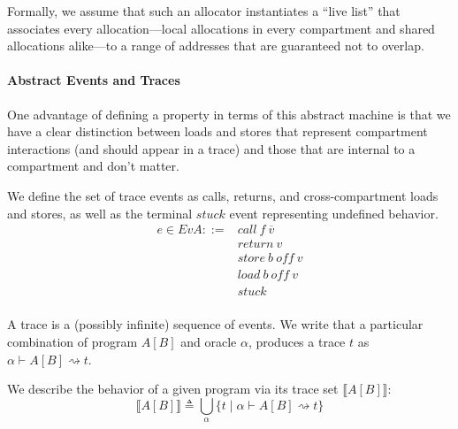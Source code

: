\documentclass{article}
\begin{document}
Formally, we assume that such an allocator instantiates a ``live list'' that associates
every allocation---local allocations in every compartment and shared allocations alike---to
a range of addresses that are guaranteed not to overlap.

\paragraph{Abstract Events and Traces}

One advantage of defining a property in terms of this abstract machine is that we have a clear
distinction between loads and stores that represent compartment interactions (and should appear
in a trace) and those that are internal to a compartment and don't matter.

We define the set of trace events as calls, returns, and cross-compartment loads and stores,
as well as the terminal \(\mathit{stuck}\) event representing undefined behavior.
\[\begin{split}
e \in EvA ::= & \mathit{call} ~ f ~ \overline{v} \\
& \mathit{return} ~ v \\
& \mathit{store} ~ b ~ \mathit{off} ~ v \\
& \mathit{load} ~ b ~ \mathit{off} ~ v \\
& \mathit{stuck} \\
\end{split}\]

A trace is a (possibly infinite) sequence of events.
We write that a particular combination of program \(A[B]\) and oracle \(\alpha\),
produces a trace \(t\) as \(\alpha \vdash A[B] \rightsquigarrow t\).

We describe the behavior of a given program via its trace set \(\llbracket A[B] \rrbracket\): 
\[\llbracket A[B] \rrbracket \triangleq \bigcup_{\alpha}
\{ t \mid \alpha \vdash A[B] \rightsquigarrow t \}\]
\end{document}
